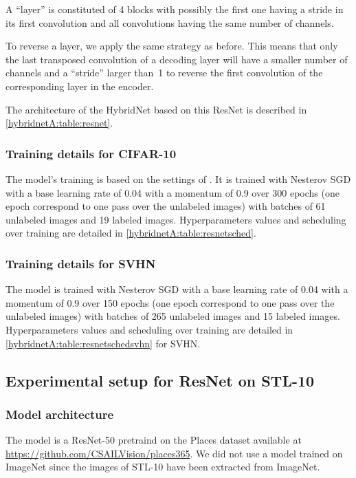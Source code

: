 A ``layer'' is constituted of 4 blocks with possibly the first one having a stride in its first convolution and all convolutions having the same number of channels.

To reverse a layer, we apply the same strategy as before. This means that only the last transposed convolution of a decoding layer will have a smaller number of channels and a ``stride'' larger than~1 to reverse the first convolution of the corresponding layer in the encoder.

The architecture of the HybridNet based on this ResNet is described in \autoref{hybridnetA:table:resnet}.

\subsubsection{Training details for CIFAR-10}

The model's training is based on the settings of \citet{Tarvainen2017}. It is trained with Nesterov SGD with a base learning rate of 0.04 with a momentum of 0.9 over 300 epochs (one epoch correspond to one pass over the unlabeled images) with batches of 61 unlabeled images and 19 labeled images. Hyperparameters values and scheduling over training are detailed in \autoref{hybridnetA:table:resnetsched}.

\subsubsection{Training details for SVHN}

The model is trained with Nesterov SGD with a base learning rate of 0.04 with a momentum of 0.9 over 150 epochs (one epoch correspond to one pass over the unlabeled images) with batches of 265 unlabeled images and 15 labeled images. Hyperparameters values and scheduling over training are detailed in \autoref{hybridnetA:table:resnetschedsvhn} for SVHN.


\subsection{Experimental setup for ResNet on STL-10}

\subsubsection{Model architecture}

The model is a ResNet-50 pretraind on the Places dataset available at \url{https://github.com/CSAILVision/places365}. We did not use a model trained on ImageNet since the images of STL-10 have been extracted from ImageNet.

